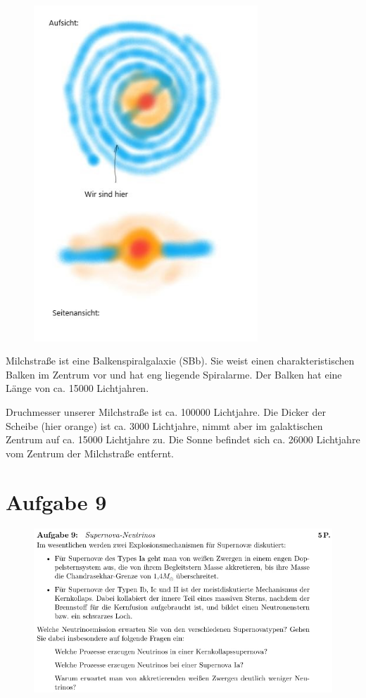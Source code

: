 \begin{figure}[H]
    \centering
    \includegraphics[width=0.75\textwidth]{images/Aufgabe8c_skizze.jpg}
    \label{fig:5}
\end{figure}

    \justifying Milchstraße ist eine Balkenspiralgalaxie (SBb). Sie weist einen charakteristischen Balken im Zentrum vor und hat eng
    liegende Spiralarme. Der Balken hat eine Länge von ca. 15000 Lichtjahren.

    \justifying Druchmesser unserer Milchstraße ist ca. 100000 Lichtjahre. Die Dicker der Scheibe (hier orange) ist ca. 3000
    Lichtjahre, nimmt aber im galaktischen Zentrum auf ca. 15000 Lichtjahre zu. Die Sonne befindet sich ca. 26000 Lichtjahre vom Zentrum der
    Milchstraße entfernt. 

\section{Aufgabe 9}

\begin{figure}[H]
    \centering
    \includegraphics[width=\textwidth]{images/Aufgabe9.jpg}
    \label{fig:6}
\end{figure}




